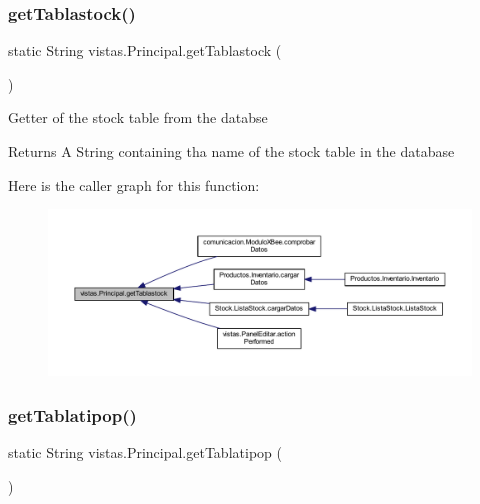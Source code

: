 \subsubsection{\texorpdfstring{get\+Tablastock()}{getTablastock()}}
{\footnotesize\ttfamily static String vistas.\+Principal.\+get\+Tablastock (\begin{DoxyParamCaption}{ }\end{DoxyParamCaption})\hspace{0.3cm}{\ttfamily [static]}}

Getter of the stock table from the databse \begin{DoxyReturn}{Returns}
A String containing tha name of the stock table in the database 
\end{DoxyReturn}
Here is the caller graph for this function\+:
\nopagebreak
\begin{figure}[H]
\begin{center}
\leavevmode
\includegraphics[width=350pt]{classvistas_1_1_principal_a004b49e26858496e0f5097a079b3aba5_icgraph}
\end{center}
\end{figure}
\mbox{\label{classvistas_1_1_principal_a3cf8de4e71a59fc279da130e39af6cd2}} 
\subsubsection{\texorpdfstring{get\+Tablatipop()}{getTablatipop()}}
{\footnotesize\ttfamily static String vistas.\+Principal.\+get\+Tablatipop (\begin{DoxyParamCaption}{ }\end{DoxyParamCaption})\hspace{0.3cm}{\ttfamily [static]}}

